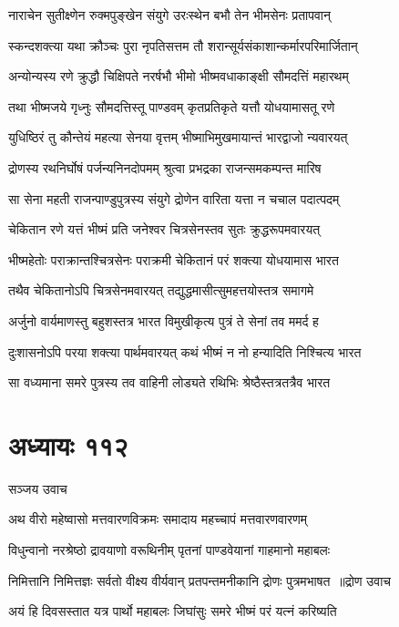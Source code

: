 \twolineshloka
{नाराचेन सुतीक्ष्णेन रुक्मपुङ्खेन संयुगे}
{उरःस्थेन बभौ तेन भीमसेनः प्रतापवान्}


\twolineshloka
{स्कन्दशक्त्या यथा क्रौञ्चः पुरा नृपतिसत्तम}
{तौ शरान्सूर्यसंकाशान्कर्मारपरिमार्जितान्}


\twolineshloka
{अन्योन्यस्य रणे क्रुद्धौ चिक्षिपते नरर्षभौ}
{भीमो भीष्मवधाकाङ्क्षी सौमदत्तिं महारथम्}


\twolineshloka
{तथा भीष्मजये गृध्नुः सौमदत्तिस्तू पाण्डवम्}
{कृतप्रतिकृते यत्तौ योधयामासतू रणे}


\twolineshloka
{युधिष्ठिरं तु कौन्तेयं महत्या सेनया वृत्तम्}
{भीष्माभिमुखमायान्तं भारद्वाजो न्यवारयत्}


\twolineshloka
{द्रोणस्य रथनिर्घोषं पर्जन्यनिनदोपमम्}
{श्रुत्वा प्रभद्रका राजन्समकम्पन्त मारिष}


\twolineshloka
{सा सेना महती राजन्पाण्डुपुत्रस्य संयुगे}
{द्रोणेन वारिता यत्ता न चचाल पदात्पदम्}


\twolineshloka
{चेकितान रणे यत्तं भीष्मं प्रति जनेश्वर}
{चित्रसेनस्तव सुतः क्रुद्धरूपमवारयत्}


\twolineshloka
{भीष्महेतोः पराक्रान्तश्चित्रसेनः पराक्रमी}
{चेकितानं परं शक्त्या योधयामास भारत}


\twolineshloka
{तथैव चेकितानोऽपि चित्रसेनमवारयत्}
{तद्युद्धमासीत्सुमहत्तयोस्तत्र समागमे}


\twolineshloka
{अर्जुनो वार्यमाणस्तु बहुशस्तत्र भारत}
{विमुखीकृत्य पुत्रं ते सेनां तव ममर्द ह}


\twolineshloka
{दुःशासनोऽपि परया शक्त्या पार्थमवारयत्}
{कथं भीष्मं न नो हन्यादिति निश्चित्य भारत}


\twolineshloka
{सा वध्यमाना समरे पुत्रस्य तव वाहिनी}
{लोड्यते रथिभिः श्रेष्ठैस्तत्रतत्रैव भारत}


\chapter{अध्यायः ११२}
\twolineshloka
{सञ्जय उवाच}
{}


\twolineshloka
{अथ वीरो महेष्वासो मत्तवारणविक्रमः}
{समादाय महच्चापं मत्तवारणवारणम्}


\twolineshloka
{विधुन्वानो नरश्रेष्ठो द्रावयाणो वरूथिनीम्}
{पृतनां पाण्डवेयानां गाहमानो महाबलः}


\threelineshloka
{निमित्तानि निमित्तज्ञः सर्वतो वीक्ष्य वीर्यवान्}
{प्रतपन्तमनीकानि द्रोणः पुत्रमभाषत ॥द्रोण उवाच}
{}


\twolineshloka
{अयं हि दिवसस्तात यत्र पार्थो महाबलः}
{जिघांसुः समरे भीष्मं परं यत्नं करिष्यति}


